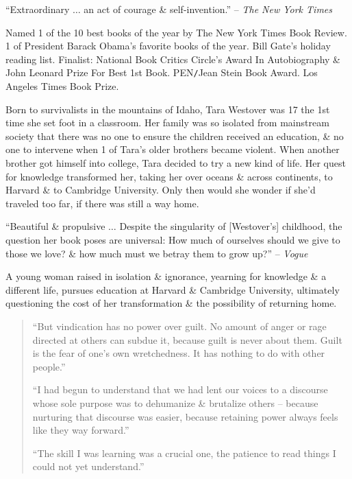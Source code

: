 \documentclass{article}
\begin{document}
\begin{enumerate}
	``Extraordinary $\ldots$ an act of courage \& self-invention.'' -- {\it The New York Times}

	Named 1 of the 10 best books of the year by The New York Times Book Review. 1 of President {\sc Barack Obama}'s favorite books of the year. {\sc Bill Gate}'s holiday reading list. Finalist: National Book Critics Circle's Award In Autobiography \& John Leonard Prize For Best 1st Book. PEN{\tt/}Jean Stein Book Award. Los Angeles Times Book Prize.

	Born to survivalists in the mountains of Idaho, {\sc Tara Westover} was 17 the 1st time she set foot in a classroom. Her family was so isolated from mainstream society that there was no one to ensure the children received an education, \& no one to intervene when 1 of {\sc Tara}'s older brothers became violent. When another brother got himself into college, {\sc Tara} decided to try a new kind of life. Her quest for knowledge transformed her, taking her over oceans \& across continents, to Harvard \& to Cambridge University. Only then would she wonder if she'd traveled too far, if there was still a way home.

	``Beautiful \& propulsive $\ldots$ Despite the singularity of [{\sc Westover}'s] childhood, the question her book poses are universal: How much of ourselves should we give to those we love? \& how much must we betray them to grow up?'' -- {\it Vogue}

	A young woman raised in isolation \& ignorance, yearning for knowledge \& a different life, pursues education at Harvard \& Cambridge University, ultimately questioning the cost of her transformation \& the possibility of returning home.
	\begin{quote}
		\item ``But vindication has no power over guilt. No amount of anger or rage directed at others can subdue it, because guilt is never about them. Guilt is the fear of one's own wretchedness. It has nothing to do with other people.''
		\item ``I had begun to understand that we had lent our voices to a discourse whose sole purpose was to dehumanize \& brutalize others -- because nurturing that discourse was easier, because retaining power always feels like they way forward.''
		\item ``The skill I was learning was a crucial one, the patience to read things I could not yet understand.''
	\end{quote}


\end{enumerate}
\end{document}
